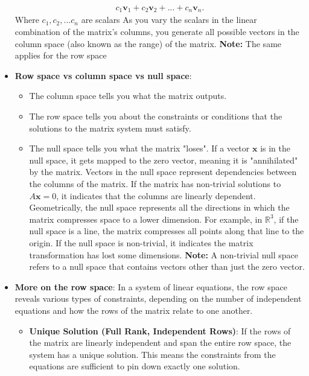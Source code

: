 \documentclass{report}
\begin{document}
\begin{itemize}
        \begin{align*}
            c_{1}\mathbf{v}_{1} + c_{2}\mathbf{v}_{2} + ... + c_{n}\mathbf{v}_{n}
        .\end{align*}
        \bigbreak \noindent 
        Where $c_{1}, c_{2}, ... c_{n}$ are scalars
        \bigbreak \noindent 
        As you vary the scalars in the linear combination of the matrix's columns, you generate all possible vectors in the column space (also known as the range) of the matrix.
        \bigbreak \noindent 
        \textbf{Note:} The same applies for the row space
    \item \textbf{Row space vs column space vs null space}:
        \begin{itemize}
            \item The column space tells you what the matrix outputs.
            \item The row space tells you about the constraints or conditions that the solutions to the matrix system must satisfy.
            \item The null space tells you what the matrix "loses". If a vector $\mathbf{x}$ is in the null space, it gets mapped to the zero vector, meaning it is "annihilated" by the matrix. Vectors in the null space represent dependencies between the columns of the matrix. If the matrix has non-trivial solutions to $A\mathbf{x}=0$, it indicates that the columns are linearly dependent.
                \bigbreak \noindent 
                Geometrically, the null space represents all the directions in which the matrix compresses space to a lower dimension.
                For example, in $\mathbb{R}^{3}$, if the null space is a line, the matrix compresses all points along that line to the origin.
                \bigbreak \noindent 
                If the null space is non-trivial, it indicates the matrix transformation has lost some dimensions.
                \bigbreak \noindent 
                \textbf{Note:} A non-trivial null space refers to a null space that contains vectors other than just the zero vector.
        \end{itemize}
    \item \textbf{More on the row space}: In a system of linear equations, the row space reveals various types of constraints, depending on the number of independent equations and how the rows of the matrix relate to one another. 
        \begin{itemize}
            \item \textbf{Unique Solution (Full Rank, Independent Rows)}: If the rows of the matrix are linearly independent and span the entire row space, the system has a unique solution. This means the constraints from the equations are sufficient to pin down exactly one solution.

\end{itemize}
\end{itemize}
\end{document}
